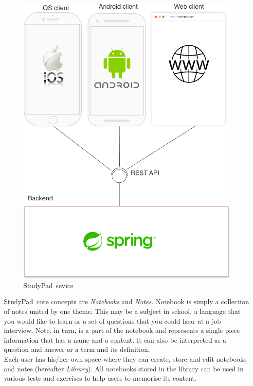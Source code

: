 \documentclass[thesis=B,english]{FITthesis}[2012/10/20]
\newcommand{\appname}{StudyPad}
\begin{document}
\begin{figure}[H]
\centering
  \includegraphics[scale=0.26]{systemdesc}
  \caption{\appname\ sevice}
  \label{fig:android-component}
\end{figure}
\appname\ core concepts are \textit{Notebooks} and \textit{Notes}. Notebook is simply a collection of notes united by one theme. This may be a subject in school, a language that you would like to learn or a set of questions that you could hear at a job interview. Note, in turn, is a part of the notebook and represents a single piece information that has a name and a content. It can also be interpreted as a question and answer or a term and its definition.
\\

Each user has his/her own space where they can create, store and edit notebooks and notes (hereafter \textit{Library}). All notebooks stored in the library can be used in various tests and exercises to help users to memorise its content.
\end{document}

